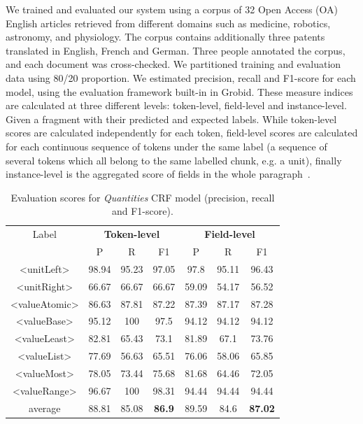 \documentclass[sigconf]{acmart}
\begin{document}
We trained and evaluated our system using a corpus of 32 Open Access (OA) English articles retrieved from different domains such as medicine, robotics, astronomy, and physiology. The corpus contains additionally three patents translated in English, French and German. Three people annotated the corpus, and each document was cross-checked. We partitioned training and evaluation data using 80/20 proportion. We estimated precision, recall and F1-score for each model, using the evaluation framework built-in in Grobid. These measure indices are calculated at three different levels: token-level, field-level and instance-level. Given a fragment with their predicted and expected labels. While token-level scores are calculated independently for each token, field-level scores are calculated for each continuous sequence of tokens under the same label (a sequence of several tokens which all belong to the same labelled chunk, e.g. a unit), finally instance-level is the aggregated score of fields in the whole paragraph~\cite{foppiano2019proposal}. 

\begin{table}[ht]
   \caption{Evaluation scores for \textit{Quantities} CRF model (precision, recall and F1-score).}
   \label{tab:quantities-evaluation}
   \begin{tabular}{c|ccc|ccc}
       \toprule
       Label & \multicolumn{3}{c}{\textbf{Token-level}} & \multicolumn{3}{c}{\textbf{Field-level}}\\
        & P & R & F1 & P & R & F1 \\
       \midrule
       <unitLeft>    & 98.94 & 95.23 & 97.05 & 97.8  & 95.11 & 96.43\\
       <unitRight>   & 66.67 & 66.67 & 66.67 & 59.09 & 54.17 & 56.52\\
       <valueAtomic> & 86.63 & 87.81 & 87.22 & 87.39 & 87.17 & 87.28\\
       <valueBase>   & 95.12 & 100   & 97.5  & 94.12 & 94.12 & 94.12\\
       <valueLeast>  & 82.81 & 65.43 & 73.1  & 81.89 & 67.1  & 73.76\\
       <valueList>   & 77.69 & 56.63 & 65.51 & 76.06 & 58.06 & 65.85\\
       <valueMost>   & 78.05 & 73.44 & 75.68 & 81.68 & 64.46 & 72.05\\
       <valueRange>  & 96.67 & 100   & 98.31 & 94.44 & 94.44 & 94.44\\
       \midrule
       average       & 88.81  & 85.08 & \textbf{86.9} & 89.59 & 84.6 & \textbf{87.02}\\
       \bottomrule
   \end{tabular}
\end{table}
\end{document}
